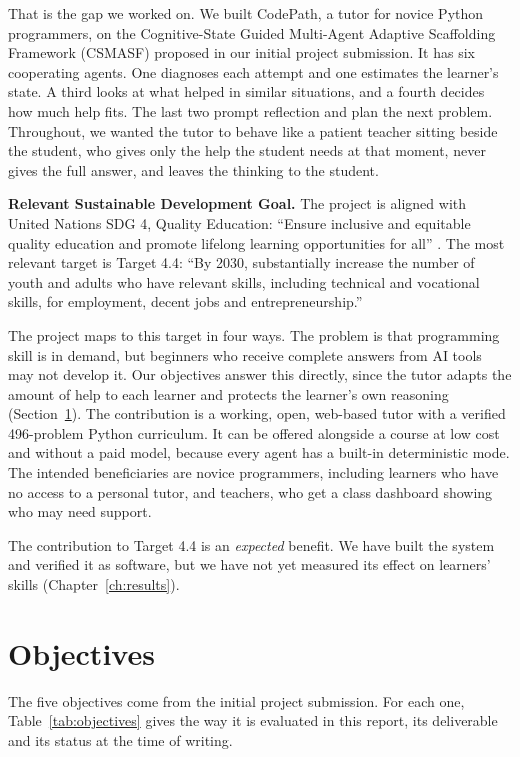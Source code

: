 That is the gap we worked on. We built CodePath, a tutor for novice Python programmers, on the Cognitive-State Guided Multi-Agent Adaptive Scaffolding Framework (CSMASF) proposed in our initial project submission. It has six cooperating agents. One diagnoses each attempt and one estimates the learner's state. A third looks at what helped in similar situations, and a fourth decides how much help fits. The last two prompt reflection and plan the next problem. Throughout, we wanted the tutor to behave like a patient teacher sitting beside the student, who gives only the help the student needs at that moment, never gives the full answer, and leaves the thinking to the student.

\textbf{Relevant Sustainable Development Goal.} The project is aligned with United Nations SDG 4, Quality Education: ``Ensure inclusive and equitable quality education and promote lifelong learning opportunities for all'' \cite{un2015}. The most relevant target is Target 4.4: ``By 2030, substantially increase the number of youth and adults who have relevant skills, including technical and vocational skills, for employment, decent jobs and entrepreneurship.''

The project maps to this target in four ways. The problem is that programming skill is in demand, but beginners who receive complete answers from AI tools may not develop it. Our objectives answer this directly, since the tutor adapts the amount of help to each learner and protects the learner's own reasoning (Section~\ref{sec:objectives}). The contribution is a working, open, web-based tutor with a verified 496-problem Python curriculum. It can be offered alongside a course at low cost and without a paid model, because every agent has a built-in deterministic mode. The intended beneficiaries are novice programmers, including learners who have no access to a personal tutor, and teachers, who get a class dashboard showing who may need support.

The contribution to Target 4.4 is an \emph{expected} benefit. We have built the system and verified it as software, but we have not yet measured its effect on learners' skills (Chapter~\ref{ch:results}).

\section{Objectives}\label{sec:objectives}
The five objectives come from the initial project submission. For each one, Table~\ref{tab:objectives} gives the way it is evaluated in this report, its deliverable and its status at the time of writing.

